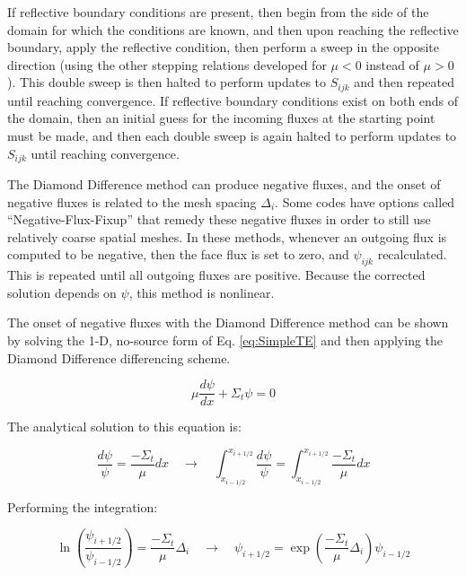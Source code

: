 \documentclass[10pt]{article}
\begin{document}
\begin{flushleft}
If reflective boundary conditions are present, then begin from the side of the domain for which the conditions are known, and then upon reaching the reflective boundary, apply the reflective condition, then perform a sweep in the opposite direction (using the other stepping relations developed for \(\mu<0\) instead of \(\mu>0\)). This double sweep is then halted to perform updates to \(S_{ijk}\) and then repeated until reaching convergence. If reflective boundary conditions exist on both ends of the domain, then an initial guess for the incoming fluxes at the starting point must be made, and then each double sweep is again halted to perform updates to \(S_{ijk}\) until reaching convergence. 

The Diamond Difference method can produce negative fluxes, and the onset of negative fluxes is related to the mesh spacing \(\Delta_i\). Some codes have options called ``Negative-Flux-Fixup'' that remedy these negative fluxes in order to still use relatively coarse spatial meshes. In these methods, whenever an outgoing flux is computed to be negative, then the face flux is set to zero, and \(\psi_{ijk}\) recalculated. This is repeated until all outgoing fluxes are positive. Because the corrected solution depends on \(\psi\), this method is nonlinear.  

\begin{tcolorbox}[breakable]
The onset of negative fluxes with the Diamond Difference method can be shown by solving the 1-D, no-source form of Eq. \eqref{eq:SimpleTE} and then applying the Diamond Difference differencing scheme.

\begin{equation}
\label{eq:Ex2}
\mu\frac{d\psi}{dx}+\Sigma_t\psi=0
\end{equation}

The analytical solution to this equation is:

\begin{equation}
\frac{d\psi}{\psi}=\frac{-\Sigma_t}{\mu}dx\quad\rightarrow\quad\int_{x_{i-1/2}}^{x_{i+1/2}}\frac{d\psi}{\psi}=\int_{x_{i-1/2}}^{x_{i+1/2}}\frac{-\Sigma_t}{\mu}dx
\end{equation}

Performing the integration:

\begin{equation}
\label{eq:124}
\ln{\left(\frac{\psi_{i+1/2}}{\psi_{i-1/2}}\right)}=\frac{-\Sigma_t}{\mu}\Delta_i\quad\rightarrow\quad\psi_{i+1/2}=\exp{\left(\frac{-\Sigma_t}{\mu}\Delta_i\right)}\psi_{i-1/2}
\end{equation}


\end{tcolorbox}
\end{flushleft}
\end{document}
